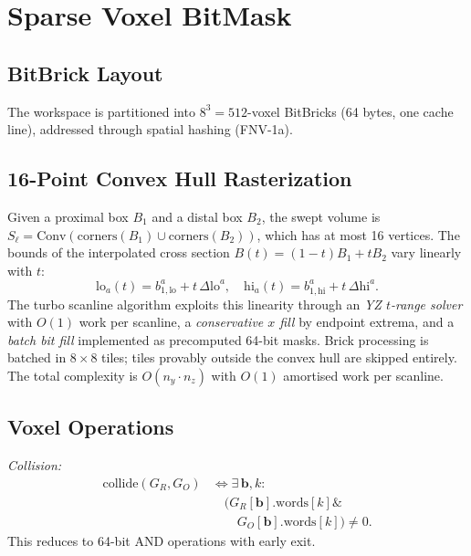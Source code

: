 \documentclass[journal]{IEEEtran}
\begin{document}
\section{Sparse Voxel BitMask}\label{sec:voxel}

\subsection{BitBrick Layout}

The workspace is partitioned into $8^3 = 512$-voxel BitBricks
(64 bytes, one cache line), addressed through spatial hashing
(FNV-1a).

\subsection{16-Point Convex Hull Rasterization}

Given a proximal box $B_1$ and a distal box $B_2$, the swept volume is
$S_\ell = \mathrm{Conv}(\mathrm{corners}(B_1) \cup \mathrm{corners}(B_2))$,
which has at most 16 vertices. The bounds of the interpolated cross
section $B(t) = (1-t)B_1 + tB_2$ vary linearly with $t$:
\begin{equation}\label{eq:bt_linear}
  \mathrm{lo}_a(t) = b_{1,\mathrm{lo}}^a + t\,\Delta\mathrm{lo}^a, \quad
  \mathrm{hi}_a(t) = b_{1,\mathrm{hi}}^a + t\,\Delta\mathrm{hi}^a.
\end{equation}
The turbo scanline algorithm exploits this linearity through an
\emph{YZ $t$-range solver} with $O(1)$ work per scanline, a
\emph{conservative $x$ fill} by endpoint extrema, and a
\emph{batch bit fill} implemented as precomputed 64-bit masks.
Brick processing is batched in $8{\times}8$ tiles; tiles provably
outside the convex hull are skipped entirely. The total complexity is
$O(n_y \cdot n_z)$ with $O(1)$ amortised work per scanline.

\subsection{Voxel Operations}

\emph{Collision:}
\begin{equation}
  \begin{aligned}
    \mathrm{collide}(G_R, G_O)
    &\Leftrightarrow \exists\,\bm{b}, k: \\
    &\quad (G_R[\bm{b}].\mathrm{words}[k] \mathbin{\&} \\
    &\qquad G_O[\bm{b}].\mathrm{words}[k]) \ne 0.
  \end{aligned}
\end{equation}
This reduces to 64-bit AND operations with early exit.
\end{document}
